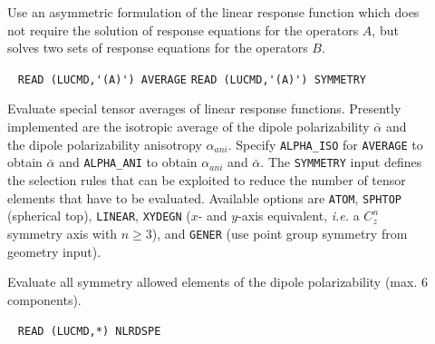 \begin{center}
\end{center}

\begin{description}
\item[] 
Use an asymmetric formulation of the linear response function which
does not require the solution of response equations for the operators $A$, 
but solves two sets of response equations for the operators $B$.
%
%
%
\item[] \verb| |\newline
   \verb|READ (LUCMD,'(A)') AVERAGE|\newline
   \verb|READ (LUCMD,'(A)') SYMMETRY|

Evaluate special tensor averages of linear response functions.
Presently implemented are the isotropic average of the dipole polarizability
$\bar{\alpha}$ and the dipole polarizability anisotropy $\alpha_{ani}$.
Specify \verb+ALPHA_ISO+ for \verb+AVERAGE+ to obtain $\bar{\alpha}$ and
\verb+ALPHA_ANI+ to obtain $\alpha_{ani}$ and $\bar{\alpha}$.
The \verb+SYMMETRY+ input defines the selection rules that can be
exploited to reduce the number of tensor elements that have to be
evaluated. Available options are
\verb+ATOM+, \verb+SPHTOP+ (spherical top), \verb+LINEAR+,
\verb+XYDEGN+ ($x$- and $y$-axis equivalent, {\it i.e.\/} a $C_z^n$
symmetry axis with $n \ge 3$),  and \verb+GENER+ (use point
group symmetry from geometry input).
 
\item[] 
Evaluate all symmetry allowed elements of the dipole polarizability
(max. 6 components).

\item[] \verb| |\newline
   \verb|READ (LUCMD,*) NLRDSPE|


\end{description}
